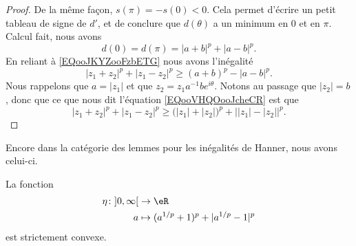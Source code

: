 \begin{proof}
    De la même façon, \( s(\pi)=-s(0)<0\). Cela permet d'écrire un petit tableau de signe de \( d'\), et de conclure que \( d(\theta)\) a un minimum en \( 0\) et en \( \pi\). Calcul fait, nous avons
    \begin{equation}
        d(0)=d(\pi)=| a+b |^p+| a-b |^p.
    \end{equation}
    En reliant à \eqref{EQooJKYZooFzbETG} nous avons l'inégalité
    \begin{equation}        \label{EQooVHQOooJcheCR}
        | z_1+z_2 |^p+| z_1-z_2 |^p\geq (a+b)^p-| a-b |^p.
    \end{equation}
    Nous rappelons que \( a=| z_1 |\) et que \( z_2=z_1a^{-1}b e^{i\theta}\). Notons au passage que \( | z_2 |=b\), donc que ce que nous dit l'équation \eqref{EQooVHQOooJcheCR} est que
    \begin{equation}    
        | z_1+z_2 |^p+| z_1-z_2 |^p\geq \big( | z_1 |+| z_2 | \big)^p+\big| | z_1 |-| z_2 | \big|^p.
    \end{equation}
\end{proof}

Encore dans la catégorie des lemmes pour les inégalités de Hanner, nous avons celui-ci.
\begin{lemma}     \label{LEMooTCNEooADpNai}
    La fonction
    \begin{equation}
        \begin{aligned}
        \eta\colon \mathopen] 0 , \infty \mathclose[&\to \eR \\
            a&\mapsto (a^{1/p}+1)^p+| a^{1/p}-1 |^p 
        \end{aligned}
    \end{equation}
    est strictement convexe.
\end{lemma}


